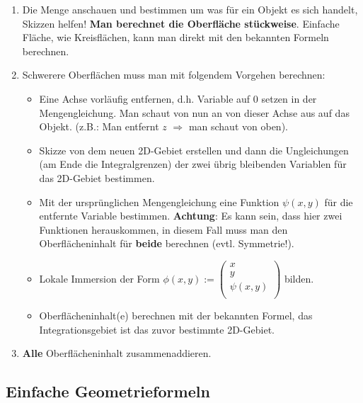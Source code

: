 \documentclass[a4paper, fontsize = 8pt, landscape]{scrartcl}
\begin{document}
\begin{multicols*}{3}
\begin{small}
        \begin{enumerate}
            \item Die Menge anschauen und bestimmen um was für ein Objekt es sich handelt, Skizzen helfen! \textbf{Man berechnet die Oberfläche stückweise}. Einfache Fläche, wie Kreisflächen, kann man direkt mit den bekannten Formeln berechnen.
            \item Schwerere Oberflächen muss man mit folgendem Vorgehen berechnen:
                  \begin{itemize}
                      \item Eine Achse vorläufig entfernen, d.h. Variable auf $0$ setzen in der Mengengleichung. Man schaut von nun an von dieser Achse aus auf das Objekt. (z.B.: Man entfernt $z$ $\Rightarrow$ man schaut von oben).
                      \item Skizze von dem neuen 2D-Gebiet erstellen und dann die Ungleichungen (am Ende die Integralgrenzen) der zwei übrig bleibenden Variablen für das 2D-Gebiet bestimmen.
                      \item Mit der ursprünglichen Mengengleichung eine Funktion $\psi(x,y)$ für die entfernte Variable bestimmen. \textbf{Achtung}: Es kann sein, dass hier zwei Funktionen herauskommen, in diesem Fall muss man den Oberflächeninhalt für \textbf{beide} berechnen (evtl. Symmetrie!).
                      \item Lokale Immersion der Form $\phi(x,y) := \begin{pmatrix}
                                    x \\ y \\ \psi(x,y) \\
                                \end{pmatrix}$ bilden.
                      \item Oberflächeninhalt(e) berechnen mit der bekannten Formel, das Integrationsgebiet ist das zuvor bestimmte 2D-Gebiet.
                  \end{itemize}
            \item \textbf{Alle} Oberflächeninhalt zusammenaddieren.
        \end{enumerate}

    \end{small}

    \subsection{Einfache Geometrieformeln}


\end{multicols*}
\end{document}

